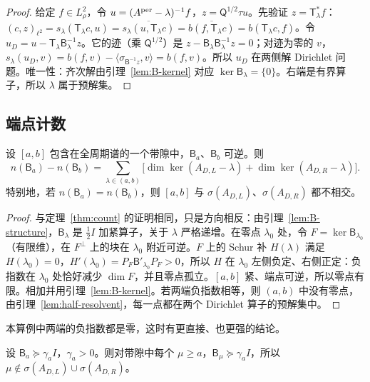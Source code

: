 \documentclass[11pt,a4paper,fontset=fandol]{ctexart}
\begin{document}
\begin{proof}
给定 $f\in L^2_\rho$，令 $u=(A^{\rm per}-\lambda)^{-1}f$，$z=\mathsf Q^{1/2}\tau u$。先验证 $z=\mathsf T_\lambda^*f$：$(c,z)_{\ell^2}=s_\lambda(\mathsf T_\lambda c,u)=\overline{s_\lambda(u,\mathsf T_\lambda c)}=\overline{b(f,\mathsf T_\lambda c)}=b(\mathsf T_\lambda c,f)$。令 $u_D=u-\mathsf T_\lambda\mathsf B_\lambda^{-1}z$。它的迹（乘 $\mathsf Q^{1/2}$）是 $z-\mathsf B_\lambda\mathsf B_\lambda^{-1}z=0$；对迹为零的 $v$，$s_\lambda(u_D,v)=b(f,v)-\langle\sigma_{\mathsf B^{-1}z},v\rangle=b(f,v)$。所以 $u_D$ 在两侧解 Dirichlet 问题。唯一性：齐次解由引理~\ref{lem:B-kernel} 对应 $\ker\mathsf B_\lambda=\{0\}$。右端是有界算子，所以 $\lambda$ 属于预解集。
\end{proof}

\subsection{端点计数}

\begin{theorem}[表面态的端点计数]
\label{thm:surface-count}
设 $[a,b]$ 包含在全周期谱的一个带隙中，$\mathsf B_a$、$\mathsf B_b$ 可逆。则
\[
n(\mathsf B_a)-n(\mathsf B_b)=\sum_{\lambda\in(a,b)}\bigl[\dim\ker(A_{D,L}-\lambda)+\dim\ker(A_{D,R}-\lambda)\bigr].
\]
特别地，若 $n(\mathsf B_a)=n(\mathsf B_b)$，则 $[a,b]$ 与 $\sigma(A_{D,L})$、$\sigma(A_{D,R})$ 都不相交。
\end{theorem}

\begin{proof}
与定理~\ref{thm:count} 的证明相同，只是方向相反：由引理~\ref{lem:B-structure}，$\mathsf B_\lambda$ 是 $\tfrac12I$ 加紧算子，关于 $\lambda$ 严格递增。在零点 $\lambda_0$ 处，令 $F=\ker\mathsf B_{\lambda_0}$（有限维），在 $F^\perp$ 上的块在 $\lambda_0$ 附近可逆。$F$ 上的 Schur 补 $H(\lambda)$ 满足 $H(\lambda_0)=0$，$H'(\lambda_0)=P_F\mathsf B'_{\lambda_0}P_F>0$，所以 $H$ 在 $\lambda_0$ 左侧负定、右侧正定：负指数在 $\lambda_0$ 处恰好减少 $\dim F$，并且零点孤立。$[a,b]$ 紧、端点可逆，所以零点有限。相加并用引理~\ref{lem:B-kernel}。若两端负指数相等，则 $(a,b)$ 中没有零点，由引理~\ref{lem:half-resolvent}，每一点都在两个 Dirichlet 算子的预解集中。
\end{proof}

本算例中两端的负指数都是零，这时有更直接、也更强的结论。

\begin{corollary}[下端点正定就够了]
\label{cor:surface-monotone}
设 $\mathsf B_a\succeq\gamma_aI$，$\gamma_a>0$。则对带隙中每个 $\mu\ge a$，$\mathsf B_\mu\succeq\gamma_aI$，所以 $\mu\notin\sigma(A_{D,L})\cup\sigma(A_{D,R})$。
\end{corollary}
\end{document}
